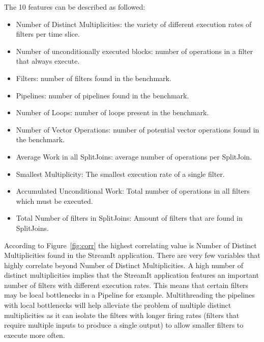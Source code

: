 The 10 features can be described as followed:
\begin{itemize}
\item Number of Distinct Multiplicities: the variety of different execution rates of filters per time slice.
\vspace{-0.5em}
\item Number of unconditionally executed blocks: number of operations in a filter that always execute.
\vspace{-0.5em}
\item Filters: number of filters found in the benchmark.
\vspace{-0.5em}
\item Pipelines: number of pipelines found in the benchmark.
\vspace{-0.5em}
\item Number of Loops: number of loops present in the benchmark.
\vspace{-0.5em}
\item Number of Vector Operations: number of potential vector operations found in the benchmark.
\vspace{-0.5em}
\item Average Work in all SplitJoins: average number of operations per SplitJoin.
\vspace{-0.5em}
\item Smallest Multiplicity: The smallest execution rate of a single filter.
\vspace{-0.5em}
\item Accumulated Unconditional Work: Total number of operations in all filters which must be executed.
\vspace{-0.5em}
\item Total Number of filters in SplitJoins: Amount of filters that are found in SplitJoins.
\end{itemize}

According to Figure~\ref{fig:corr} the highest correlating value is Number of Distinct Multiplicities found in the StreamIt application.
There are very few variables that highly correlate beyond Number of Distinct Multiplicities.
A high number of distinct multiplicities implies that the StreamIt application features an important number of filters with different execution rates.
This means that certain filters may be local bottlenecks in a Pipeline for example.
Multithreading the pipelines with local bottlenecks will help alleviate the problem of multiple distinct multiplicities as it can isolate the filters with longer firing rates (filters that require multiple inputs to produce a single output) to allow smaller filters to execute more often.

